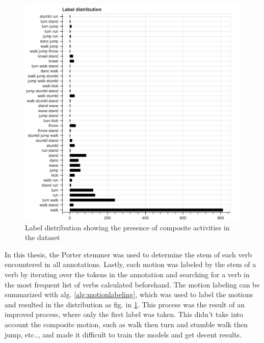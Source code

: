 			\begin{figure}[H]
				\centering
				\includegraphics[width=\textwidth]{img/label-distribution.png}
				\caption{Label distribution showing the presence of composite activities in the dataset}
				\label{fig:label-distribution}
			\end{figure}
			In this thesis, the Porter stemmer was used to determine the stem of each verb encountered in all annotations. Lastly, each motion was labeled by the stem of a verb by iterating over the tokens in the annotation and searching for a verb in the most frequent list of verbs calculated beforehand. The motion labeling can be summarized with alg. \ref{alg:motionlabeling}, which was used to label the motions and resulted in the distribution as fig. in \ref{fig:label-distribution}. This process was the result of an improved process, where only the first label was taken. This didn't take into account the composite motion, such as walk then turn and stumble walk then jump, etc.., and made it difficult to train the models and get decent results.\newline
